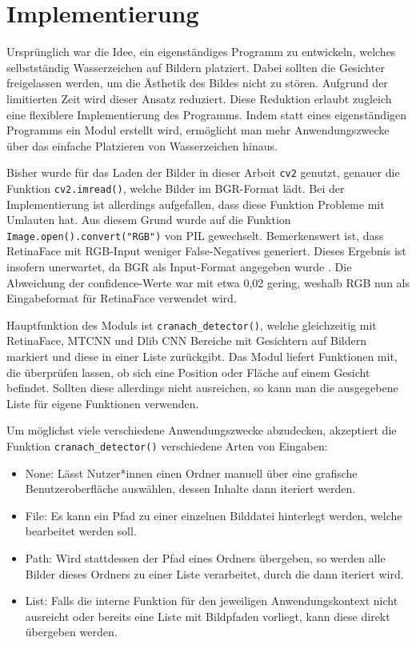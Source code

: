 \chapter{Implementierung}
%
Ursprünglich war die Idee, ein eigenständiges Programm zu entwickeln, welches selbstständig Wasserzeichen auf Bildern platziert. Dabei sollten die Gesichter freigelassen werden, um die Ästhetik des Bildes nicht zu stören. Aufgrund der limitierten Zeit wird dieser Ansatz reduziert. Diese Reduktion erlaubt zugleich eine flexiblere Implementierung des Programms. Indem statt eines eigenständigen Programms ein Modul erstellt wird, ermöglicht man mehr Anwendungszwecke über das einfache Platzieren von Wasserzeichen hinaus.

Bisher wurde für das Laden der Bilder in dieser Arbeit \texttt{cv2} genutzt, genauer die Funktion \texttt{cv2.imread()}, welche Bilder im BGR-Format lädt. Bei der Implementierung ist allerdings aufgefallen, dass diese Funktion Probleme mit Umlauten hat. Aus diesem Grund wurde auf die Funktion \texttt{Image.open().convert("RGB")} von PIL gewechselt. Bemerkenswert ist, dass RetinaFace mit RGB-Input weniger False-Negatives generiert. Dieses Ergebnis ist insofern unerwartet, da BGR als Input-Format angegeben wurde \parencite{lizardNttstar25}. Die Abweichung der \gls{confidence}-Werte war mit etwa 0{,}02 gering, weshalb RGB nun als Eingabeformat für RetinaFace verwendet wird.

Hauptfunktion des Moduls ist \texttt{cranach\_detector()}, welche gleichzeitig mit RetinaFace, MTCNN und Dlib CNN Bereiche mit Gesichtern auf Bildern markiert und diese in einer Liste zurückgibt. Das Modul liefert Funktionen mit, die überprüfen lassen, ob sich eine Position oder Fläche auf einem Gesicht befindet. Sollten diese allerdings nicht ausreichen, so kann man die ausgegebene Liste für eigene Funktionen verwenden.

Um möglichst viele verschiedene Anwendungszwecke abzudecken, akzeptiert die Funktion \texttt{cranach\_detector()} verschiedene Arten von Eingaben:
\begin{itemize}
  \item None: Lässt Nutzer*innen einen Ordner manuell über eine grafische Benutzeroberfläche auswählen, dessen Inhalte dann iteriert werden.
  \item File: Es kann ein Pfad zu einer einzelnen Bilddatei hinterlegt werden, welche bearbeitet werden soll.
  \item Path: Wird stattdessen der Pfad eines Ordners übergeben, so werden alle Bilder dieses Ordners zu einer Liste verarbeitet, durch die dann iteriert wird.
  \item List: Falls die interne Funktion für den jeweiligen Anwendungskontext nicht ausreicht oder bereits eine Liste mit Bildpfaden vorliegt, kann diese direkt übergeben werden.
\end{itemize}

